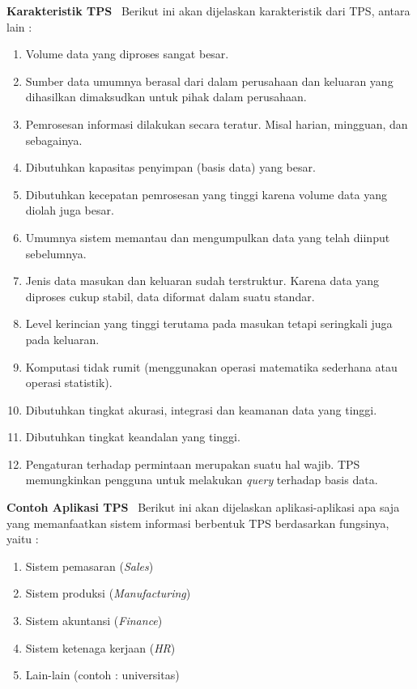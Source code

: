 \textbf{Karakteristik TPS}\
\label{sec:karakteristik_tps}
Berikut ini akan dijelaskan karakteristik dari TPS, antara lain \cite{Turban:2001} : 
\begin{enumerate}
	\item Volume data yang diproses sangat besar.
	\item Sumber data umumnya berasal dari dalam perusahaan dan keluaran yang dihasilkan dimaksudkan untuk pihak dalam perusahaan.
	\item Pemrosesan informasi dilakukan secara teratur. Misal harian, mingguan, dan sebagainya.
	\item Dibutuhkan kapasitas penyimpan (basis data) yang besar.
	\item Dibutuhkan kecepatan pemrosesan yang tinggi karena volume data yang diolah juga besar.
	\item Umumnya sistem memantau dan mengumpulkan data yang telah diinput sebelumnya.
	\item Jenis data masukan dan keluaran sudah terstruktur. Karena data yang diproses cukup stabil, data diformat dalam suatu standar.
	\item Level kerincian yang tinggi terutama pada masukan tetapi seringkali juga pada keluaran.
	\item Komputasi tidak rumit (menggunakan operasi matematika sederhana atau operasi statistik).
	\item Dibutuhkan tingkat akurasi, integrasi dan keamanan data yang tinggi.
	\item Dibutuhkan tingkat keandalan yang tinggi.
	\item Pengaturan terhadap permintaan merupakan suatu hal wajib. TPS memungkinkan pengguna untuk melakukan \textit{query} terhadap basis data.
\end{enumerate}

\textbf{Contoh Aplikasi TPS}\
\label{sec:contoh_aplikasi _tps}
Berikut ini akan dijelaskan aplikasi-aplikasi apa saja yang memanfaatkan sistem informasi berbentuk TPS berdasarkan fungsinya, yaitu \cite{Laudon:1996} :
\begin{enumerate}
	\item Sistem pemasaran (\textit{Sales})
	\item Sistem produksi (\textit{Manufacturing})
	\item Sistem akuntansi (\textit{Finance})
	\item Sistem ketenaga kerjaan (\textit{HR})
	\item Lain-lain (contoh : universitas)
\end{enumerate}

